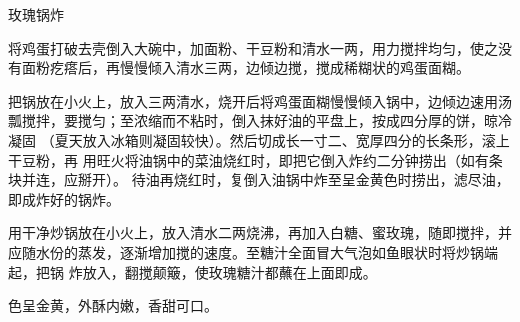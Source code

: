 %
%
%
%
%
%
%
\begin{recipe}{玫瑰锅炸}

\ingredients


\preparation

\step 将鸡蛋打破去壳倒入大碗中，加面粉、干豆粉和清水一两，用力搅拌均匀，使之没
有面粉疙瘩后，再慢慢倾入清水三两，边倾边搅，搅成稀糊状的鸡蛋面糊。

\step 把锅放在小火上，放入三两清水，烧开后将鸡蛋面糊慢慢倾入锅中，边倾边速用汤
瓢搅拌，要搅匀；至浓缩而不粘时，倒入抹好油的平盘上，按成四分厚的饼，晾冷凝固
（夏天放入冰箱则凝固较快）。然后切成长一寸二、宽厚四分的长条形，滚上干豆粉，再
用旺火将油锅中的菜油烧红时，即把它倒入炸约二分钟捞出（如有条块并连，应掰开）。
待油再烧红时，复倒入油锅中炸至呈金黄色时捞出，滤尽油，即成炸好的锅炸。

\step 用干净炒锅放在小火上，放入清水二两烧沸，再加入白糖、蜜玫瑰，随即搅拌，并
应随水份的蒸发，逐渐增加搅的速度。至糖汁全面冒大气泡如鱼眼状时将炒锅端起，把锅
炸放入，翻搅颠簸，使玫瑰糖汁都蘸在上面即成。

\features

色呈金黄，外酥内嫩，香甜可口。

\end{recipe}

